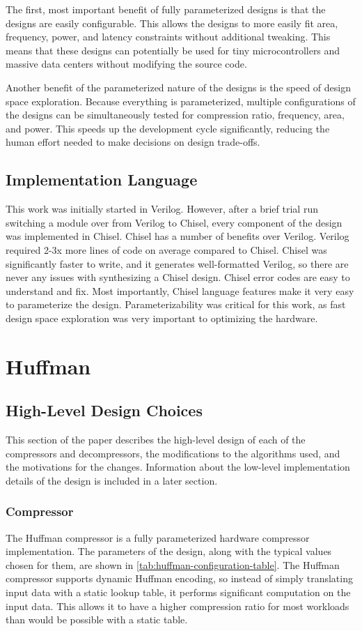 \documentclass[doublespace,nopageskip]{VTthesis}
\begin{document}
The first, most important benefit of fully parameterized designs is that the designs are easily configurable. This allows the designs to more easily fit area, frequency, power, and latency constraints without additional tweaking. This means that these designs can potentially be used for tiny microcontrollers and massive data centers without modifying the source code.

Another benefit of the parameterized nature of the designs is the speed of design space exploration. Because everything is parameterized, multiple configurations of the designs can be simultaneously tested for compression ratio, frequency, area, and power. This speeds up the development cycle significantly, reducing the human effort needed to make decisions on design trade-offs.

\subsection{Implementation Language}\label{ss:implementation_language}
This work was initially started in Verilog. However, after a brief trial run switching a module over from Verilog to Chisel, every component of the design was implemented in Chisel. Chisel has a number of benefits over Verilog. Verilog required 2-3x more lines of code on average compared to Chisel. Chisel was significantly faster to write, and it generates well-formatted Verilog, so there are never any issues with synthesizing a Chisel design. Chisel error codes are easy to understand and fix. Most importantly, Chisel language features make it very easy to parameterize the design. Parameterizability was critical for this work, as fast design space exploration was very important to optimizing the hardware.

\section{Huffman}\label{ss:huffman}
\subsection{High-Level Design Choices}\label{se:huffman_design_choices}
This section of the paper describes the high-level design of each of the compressors and decompressors, the modifications to the algorithms used, and the motivations for the changes. Information about the low-level implementation details of the design is included in a later section.

\subsubsection{Compressor}\label{sss:huffman_compressor_design}
The Huffman compressor is a fully parameterized hardware compressor implementation. The parameters of the design, along with the typical values chosen for them, are shown in \ref{tab:huffman-configuration-table}. The Huffman compressor supports dynamic Huffman encoding, so instead of simply translating input data with a static lookup table, it performs significant computation on the input data. This allows it to have a higher compression ratio for most workloads than would be possible with a static table.
\end{document}
